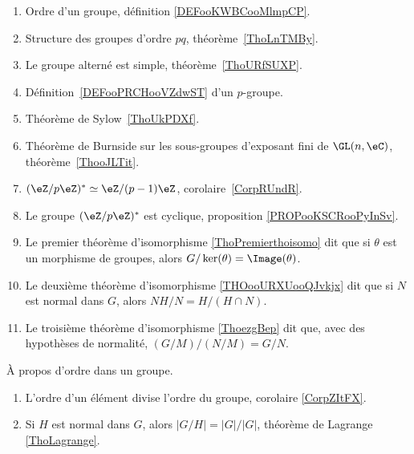 \begin{enumerate}
	\item Ordre d'un groupe, définition \ref{DEFooKWBCooMlmpCP}.
	\item Structure des groupes d'ordre \( pq\), théorème~\ref{ThoLnTMBy}.
	\item Le groupe alterné est simple, théorème~\ref{ThoURfSUXP}.
	\item Définition~\ref{DEFooPRCHooVZdwST} d'un \( p\)-groupe.
	\item Théorème de Sylow~\ref{ThoUkPDXf}.
	\item Théorème de Burnside sur les sous-groupes d'exposant fini de \( \GL(n,\eC)\), théorème~\ref{ThooJLTit}.
	\item \( (\eZ/p\eZ)^*\simeq \eZ/(p-1)\eZ\), corolaire~\ref{CorpRUndR}.
	\item
	      Le groupe \( (\eZ/p\eZ)^*\) est cyclique, proposition \ref{PROPooKSCRooPyInSv}.
	\item Le premier théorème d'isomorphisme \ref{ThoPremierthoisomo} dit que si \( \theta\) est un morphisme de groupes, alors  \( G/\ker(\theta)=\Image(\theta)\).
	\item Le deuxième théorème d'isomorphisme \ref{THOooURXUooQJvkjx} dit que si \( N\) est normal dans \( G\), alors \( NH/N=H/(H\cap N)\).
	\item Le troisième théorème d'isomorphisme \ref{ThoezgBep} dit que, avec des hypothèses de normalité, \( (G/M)/(N/M)=G/N\).
\end{enumerate}

À propos d'ordre dans un groupe.
\begin{enumerate}
	\item
	      L'ordre d'un élément divise l'ordre du groupe, corolaire \ref{CorpZItFX}.
	\item
	      Si \( H\) est normal dans \( G\), alors \( | G/H |=| G |/| G |\), théorème de Lagrange \ref{ThoLagrange}.
\end{enumerate}
